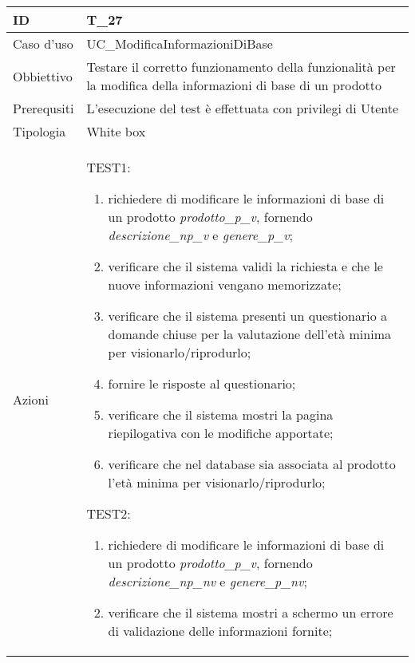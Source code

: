 \begin{table}[hb]
    \centering
    \begin{tabular}{ |p{2cm}|p{10cm}|  }
        \hline
        ID          & T\_27                                                                                                          \\\hline
        Caso d'uso  & UC\_ModificaInformazioniDiBase                                                                                 \\\hline
        Obbiettivo  & Testare il corretto funzionamento della funzionalità per la modifica della informazioni di base di un prodotto \\\hline
        Prerequsiti & L'esecuzione del test è effettuata con privilegi di Utente                                                     \\\hline
        Tipologia   & White box                                                                                                      \\\hline
        Azioni      &
        TEST1:
        \begin{enumerate}[nosep, topsep=0pt]
            \item richiedere di modificare le informazioni di base di un prodotto \emph{prodotto\_p\_v}, fornendo \emph{descrizione\_np\_v} e \emph{genere\_p\_v};
            \item verificare che il sistema validi la richiesta e che le nuove informazioni vengano memorizzate;
            \item verificare che il sistema presenti un questionario a domande chiuse per la valutazione dell'età minima per visionarlo/riprodurlo;
            \item fornire le risposte al questionario;
            \item verificare che il sistema mostri la pagina riepilogativa con le modifiche apportate;
            \item verificare che nel database sia associata al prodotto l'età minima per visionarlo/riprodurlo;
        \end{enumerate}
        \vspace{0.5cm} TEST2:
        \begin{enumerate}[nosep, topsep=0pt]
            \item richiedere di modificare le informazioni di base di un prodotto \emph{prodotto\_p\_v}, fornendo \emph{descrizione\_np\_nv} e \emph{genere\_p\_nv};
            \item verificare che il sistema mostri a schermo un errore di validazione delle informazioni fornite;
        \end{enumerate}
        \\\hline
    \end{tabular}
\end{table}

